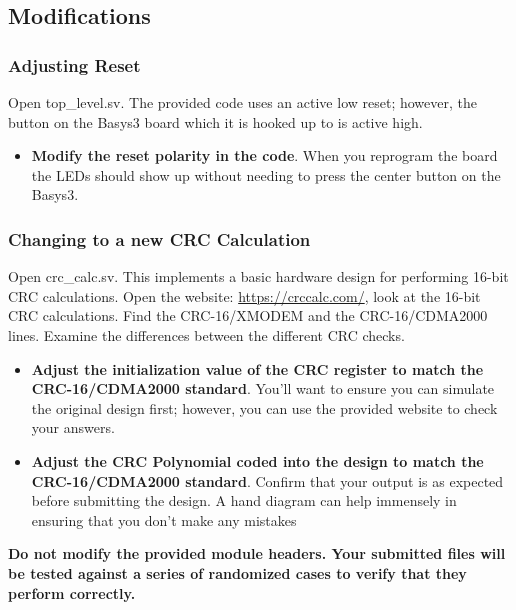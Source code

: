 \subsection{Modifications}
\subsubsection{Adjusting Reset}
Open top\_level.sv. The provided code uses an active low reset; however, the button on the Basys3 board which it is hooked up to is active high.\\
\begin{itemize}
    \item \textbf{Modify the reset polarity in the code}. When you reprogram the board the LEDs should show up without needing to press the center button on the Basys3. 
\end{itemize}


\subsubsection{Changing to a new CRC Calculation}
Open crc\_calc.sv. This implements a basic hardware design for performing 16-bit CRC calculations. Open the website: \url{https://crccalc.com/}, look at the 16-bit CRC calculations. Find the CRC-16/XMODEM and the CRC-16/CDMA2000 lines. Examine the differences between the different CRC checks.
\begin{itemize}
    \item \textbf{Adjust the initialization value of the CRC register to match the CRC-16/CDMA2000 standard}. You'll want to ensure you can simulate the original design first; however, you can use the provided website to check your answers.
    \item \textbf{Adjust the CRC Polynomial coded into the design to match the CRC-16/CDMA2000 standard}. Confirm that your output is as expected before submitting the design. A hand diagram can help immensely in ensuring that you don't make any mistakes
\end{itemize}

\textbf{Do not modify the provided module headers. Your submitted files will be tested against a series of randomized cases to verify that they perform correctly.}

